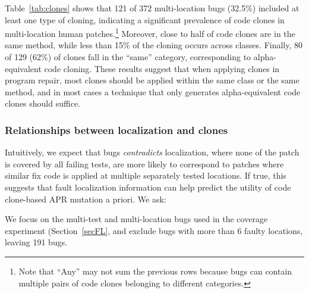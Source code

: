 \documentclass[10pt, conference]{IEEEtran}
\begin{document}
Table~\ref{tab:clones} shows that 121 of 372 multi-location bugs
(32.5\%) included at least one type of cloning,
indicating a significant prevalence of code clones in multi-location human
patches.\footnote{Note that ``Any'' may not sum the previous rows because
bugs can contain multiple pairs of code clones belonging to different
categories.}
%
Moreover, close to half of code clones are in the same method, while less than
15\% of the cloning occurs across classes. Finally, 80 of 129 (62\%) of clones
fall in the ``same'' category, corresponding to alpha-equivalent code cloning.
These results suggest that when applying clones in program repair, 
most clones should be applied within the same class or the same method, and
in most cases a technique that only generates alpha-equivalent code clones should suffice.

\subsubsection{Relationships between localization and clones}
Intuitively, we expect that bugs  \emph{contradicts} localization, where none of the patch is 
covered by all failing tests, are more likely to correspond to patches where
similar fix code is applied at multiple separately tested locations. If 
true, this suggests that fault localization information can help 
predict the utility of code clone-based APR mutation a priori. We ask:


%
We focus on the multi-test and multi-location bugs used in the coverage 
experiment (Section~\ref{secFL}, and exclude bugs with more than 6 faulty locations, leaving 191 bugs.
\end{document}
